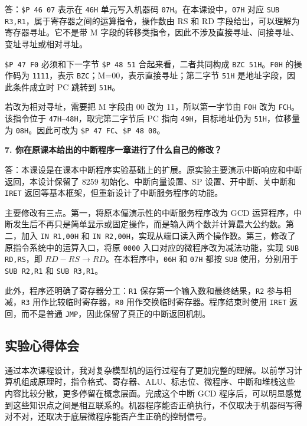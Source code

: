 \documentclass[UTF8,12pt,a4paper]{ctexart}
\newcommand{\hex}[1]{\texttt{#1H}}
\newcommand{\reg}[1]{\texttt{#1}}
\newcommand{\inst}[1]{\texttt{#1}}
\newcommand{\prog}[1]{\texttt{\$P #1}}
\begin{document}
答：\prog{46 07} 表示在 \hex{46} 单元写入机器码 \hex{07}。在本课设中，\hex{07} 对应 \inst{SUB R3,R1}，属于寄存器之间的运算指令，操作数由 RS 和 RD 字段给出，可以理解为寄存器寻址。它不是带 M 字段的转移类指令，因此不涉及直接寻址、间接寻址、变址寻址或相对寻址。

\prog{47 F0} 必须和下一字节 \prog{48 51} 合起来看，二者共同构成 \inst{BZC 51H}。\hex{F0} 的操作码为 \texttt{1111}，表示 \inst{BZC}；M=00，表示直接寻址；第二字节 \hex{51} 是地址字段，因此条件成立时 PC 跳转到 \hex{51}。

若改为相对寻址，需要把 M 字段由 00 改为 11，所以第一字节由 \hex{F0} 改为 \hex{FC}。该指令位于 \hex{47}--\hex{48}，取完第二字节后 PC 指向 \hex{49}，目标地址仍为 \hex{51}，位移量为 \hex{08}。因此可改为 \prog{47 FC}、\prog{48 08}。

\vspace{0.7em}

\textbf{7. 你在原课本给出的中断程序一章进行了什么自己的修改？}

答：本课设是在课本中断程序实验基础上的扩展。原实验主要演示中断响应和中断返回，本设计保留了 8259 初始化、中断向量设置、SP 设置、开中断、关中断和 \inst{IRET} 返回等基本框架，但重新设计了中断服务程序的功能。

主要修改有三点。第一，将原本偏演示性的中断服务程序改为 GCD 运算程序，中断发生后不再只是简单显示或固定操作，而是输入两个数并计算最大公约数。第二，加入 \inst{IN R1,00H} 和 \inst{IN R2,00H}，实现从端口读入两个操作数。第三，修改了原指令系统中的运算入口，将原 \texttt{0000} 入口对应的微程序改为减法功能，实现 \inst{SUB RD,RS}，即 $RD-RS \rightarrow RD$。在本程序中，\hex{06} 和 \hex{07} 都按 \inst{SUB} 使用，分别用于 \inst{SUB R2,R1} 和 \inst{SUB R3,R1}。

此外，程序还明确了寄存器分工：\reg{R1} 保存第一个输入数和最终结果，\reg{R2} 参与相减，\reg{R3} 用作比较临时寄存器，\reg{R0} 用作交换临时寄存器。程序结束时使用 \inst{IRET} 返回，而不是普通 \inst{JMP}，因此保留了真正的中断返回机制。

\subsection{实验心得体会}

通过本次课程设计，我对复杂模型机的运行过程有了更加完整的理解。以前学习计算机组成原理时，指令格式、寄存器、ALU、标志位、微程序、中断和堆栈这些内容比较分散，更多停留在概念层面。完成这个中断 GCD 程序后，可以明显感觉到这些知识点之间是相互联系的。机器程序能否正确执行，不仅取决于机器码写得对不对，还取决于底层微程序能否产生正确的控制信号。
\end{document}
